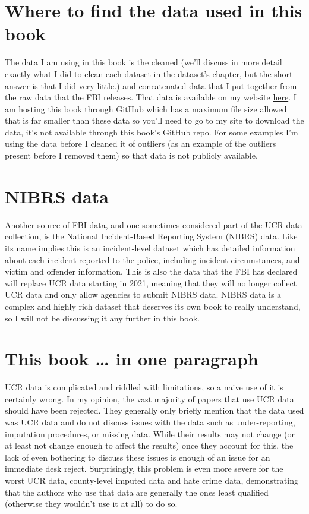 \documentclass[
  12pt,
  openany]{book}
\begin{document}
\hypertarget{where-to-find-the-data-used-in-this-book}{%
\section{Where to find the data used in this book}\label{where-to-find-the-data-used-in-this-book}}

The data I am using in this book is the cleaned (we'll discuss in more detail exactly what I did to clean each dataset in the dataset's chapter, but the short answer is that I did very little.) and concatenated data that I put together from the raw data that the FBI releases. That data is available on my website \href{https://jacobdkaplan.com/data.html}{here}. I am hosting this book through GitHub which has a maximum file size allowed that is far smaller than these data so you'll need to go to my site to download the data, it's not available through this book's GitHub repo. For some examples I'm using the data before I cleaned it of outliers (as an example of the outliers present before I removed them) so that data is not publicly available.

\hypertarget{nibrs-data}{%
\section{NIBRS data}\label{nibrs-data}}

Another source of FBI data, and one sometimes considered part of the UCR data collection, is the National Incident-Based Reporting System (NIBRS) data. Like its name implies this is an incident-level dataset which has detailed information about each incident reported to the police, including incident circumstances, and victim and offender information. This is also the data that the FBI has declared will replace UCR data starting in 2021, meaning that they will no longer collect UCR data and only allow agencies to submit NIBRS data. NIBRS data is a complex and highly rich dataset that deserves its own book to really understand, so I will not be discussing it any further in this book.

\hypertarget{this-book-in-one-paragraph}{%
\section{This book \ldots{} in one paragraph}\label{this-book-in-one-paragraph}}

UCR data is complicated and riddled with limitations, so a naive use of it is certainly wrong. In my opinion, the vast majority of papers that use UCR data should have been rejected. They generally only briefly mention that the data used was UCR data and do not discuss issues with the data such as under-reporting, imputation procedures, or missing data. While their results may not change (or at least not change enough to affect the results) once they account for this, the lack of even bothering to discuss these issues is enough of an issue for an immediate desk reject. Surprisingly, this problem is even more severe for the worst UCR data, county-level imputed data and hate crime data, demonstrating that the authors who use that data are generally the ones least qualified (otherwise they wouldn't use it at all) to do so.
\end{document}
